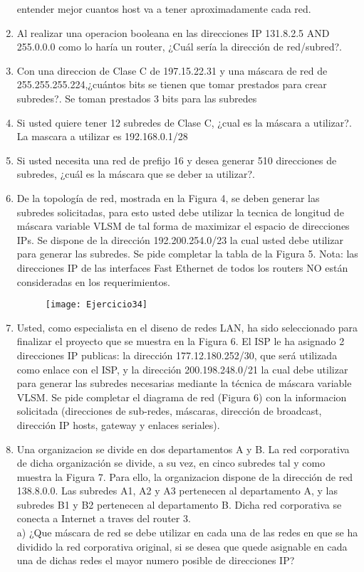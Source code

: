 \documentclass{udparticle}
\begin{document}
\begin{enumerate}
entender mejor cuantos host va a tener aproximadamente cada red.\\
\item Al realizar una operacion booleana en las direcciones IP 131.8.2.5
AND 255.0.0.0 como lo haría un router, ¿Cuál sería la dirección de 
red/subred?.
\item Con una direccion de Clase C de 197.15.22.31 y una máscara de red 
de 255.255.255.224,¿cuántos bits se tienen que tomar prestados para 
crear subredes?.
Se toman prestados 3 bits para las subredes\\
\item Si usted quiere tener 12 subredes de Clase C, ¿cual es la máscara 
a utilizar?.
La mascara a utilizar es 192.168.0.1/28\\
\item Si usted necesita una red de prefijo 16 y desea generar 510 
direcciones de subredes, ¿cuál es la máscara que se deber ıa utilizar?.
\item De la topología de red, mostrada en la Figura 4, se deben generar 
las subredes solicitadas, para esto usted debe utilizar la tecnica de 
longitud de máscara variable VLSM de tal forma de maximizar el espacio 
de direcciones IPs. Se dispone de la dirección 192.200.254.0/23 la cual 
usted debe utilizar para generar las subredes. Se pide completar la 
tabla de la Figura 5. Nota: las direcciones IP de las interfaces Fast 
Ethernet de todos los routers NO están consideradas en los requerimientos.
\begin{figure}[H]
	\centering
	\texttt{[image: Ejercicio34]}
	\end{figure}
\item Usted, como especialista en el diseno de redes LAN, ha sido seleccionado para
finalizar el proyecto que se muestra en la Figura 6. El ISP le ha asignado 2 
direcciones IP publicas: la dirección 177.12.180.252/30, que será utilizada como 
enlace con el ISP, y la dirección 200.198.248.0/21 la cual debe utilizar para 
generar las subredes necesarias mediante la técnica de máscara variable VLSM.
Se pide completar el diagrama de red (Figura 6) con la informacion solicitada
(direcciones de sub-redes, máscaras, dirección de broadcast, dirección IP 
hosts, gateway y enlaces seriales).
\clearpage
\item Una organizacion se divide en dos departamentos A y B. La red corporativa de 
dicha organización se divide, a su vez, en cinco subredes tal y como muestra la 
Figura 7. Para ello, la organizacion dispone de la dirección de red 138.8.0.0. 
Las subredes A1, A2 y A3 pertenecen al departamento A, y las subredes B1 y B2 
pertenecen al departamento B. Dicha red corporativa se conecta a Internet    a traves 
del router 3.\\
a) ¿Que máscara de red se debe utilizar en cada una de las redes en que se ha   
dividido la red corporativa original, si se desea que quede asignable en cada una 
de dichas redes el mayor numero posible de direcciones IP?\\


\end{enumerate}
\end{document}
